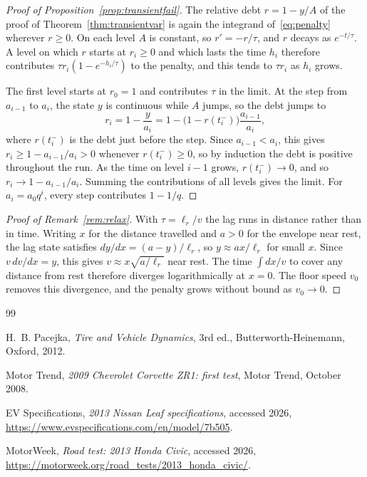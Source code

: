 \documentclass[12pt, twoside]{amsart}
\theoremstyle{definition}
\begin{document}
\begin{proof}[Proof of Proposition~\ref{prop:transientfail}]
The relative debt $r=1-y/A$ of the proof of Theorem~\ref{thm:transientvar} is again the integrand
of~\eqref{eq:penalty} wherever $r\ge0$. On each level $A$ is constant, so $r'=-r/\tau$, and $r$ decays
as $e^{-t/\tau}$. A level on which $r$ starts at $r_i\ge0$ and which lasts the time $h_i$ therefore
contributes $\tau r_i(1-e^{-h_i/\tau})$ to the penalty, and this tends to $\tau r_i$ as $h_i$ grows.

The first level starts at $r_0=1$ and contributes $\tau$ in the limit. At the step from $a_{i-1}$ to
$a_i$, the state $y$ is continuous while $A$ jumps, so the debt jumps to
\[
r_i=1-\frac{y}{a_i}=1-\big(1-r(t_i^-)\big)\frac{a_{i-1}}{a_i},
\]
where $r(t_i^-)$ is the debt just before the step. Since $a_{i-1}<a_i$, this gives
$r_i\ge1-a_{i-1}/a_i>0$ whenever $r(t_i^-)\ge0$, so by induction the debt is positive throughout the
run. As the time on level $i-1$ grows, $r(t_i^-)\to0$, and so $r_i\to1-a_{i-1}/a_i$. Summing the contributions of all levels gives the limit. For
$a_i=a_0q^i$, every step contributes $1-1/q$.
\end{proof}

\begin{proof}[Proof of Remark~\ref{rem:relax}]
With $\tau=\ell_r/v$ the lag runs in distance rather than in time. Writing $x$ for the distance
travelled and $a>0$ for the envelope near rest, the lag state satisfies $dy/dx=(a-y)/\ell_r$, so
$y\approx ax/\ell_r$ for small $x$. Since $v\,dv/dx=y$, this gives $v\approx x\sqrt{a/\ell_r}$ near
rest. The time $\int dx/v$ to cover any distance from rest therefore diverges logarithmically at
$x=0$. The floor speed $v_0$ removes this divergence, and the penalty grows without bound as
$v_0\to0$.
\end{proof}

\medskip
\begin{thebibliography}{99}

H.~B. Pacejka,
\emph{Tire and Vehicle Dynamics},
3rd ed., Butterworth-Heinemann, Oxford, 2012.

Motor Trend,
\emph{2009 Chevrolet Corvette ZR1: first test},
Motor Trend, October 2008.

EV Specifications,
\emph{2013 Nissan Leaf specifications},
accessed 2026,
\url{https://www.evspecifications.com/en/model/7b505}.

MotorWeek,
\emph{Road test: 2013 Honda Civic},
accessed 2026,
\url{https://motorweek.org/road_tests/2013_honda_civic/}.

\end{thebibliography}
\end{document}
